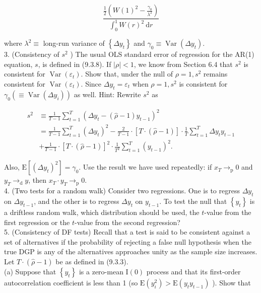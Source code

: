 \documentclass[10pt]{article}
\begin{document}
$$
\frac{\frac{1}{2}\left(W(1)^{2}-\frac{\gamma_{0}}{\lambda^{2}}\right)}{\int_{0}^{1} W(r)^{2} \mathrm{~d} r}
$$

where $\lambda^{2} \equiv$ long-run variance of $\left\{\Delta y_{t}\right\}$ and $\gamma_{0} \equiv \operatorname{Var}\left(\Delta y_{t}\right)$.\\
3. (Consistency of $s^{2}$ ) The usual OLS standard error of regression for the AR(1) equation, $s$, is defined in (9.3.8). If $|\rho|<1$, we know from Section 6.4 that $s^{2}$ is consistent for $\operatorname{Var}\left(\varepsilon_{t}\right)$. Show that, under the null of $\rho=1, s^{2}$ remains consistent for $\operatorname{Var}\left(\varepsilon_{t}\right)$. Since $\Delta y_{t}=\varepsilon_{t}$ when $\rho=1, s^{2}$ is consistent for $\gamma_{0} \left(\equiv \operatorname{Var}\left(\Delta y_{i}\right)\right)$ as well. Hint: Rewrite $s^{2}$ as

$$
\begin{aligned}
s^{2} & \equiv \frac{1}{T-1} \sum_{t=1}^{T}\left(\Delta y_{t}-(\hat{\rho}-1) y_{t-1}\right)^{2} \\
& =\frac{1}{T-1} \sum_{t=1}^{T}\left(\Delta y_{t}\right)^{2}-\frac{2}{T-1} \cdot[T \cdot(\hat{\rho}-1)] \cdot \frac{1}{T} \sum_{t=1}^{T} \Delta y_{t} y_{t-1} \\
& +\frac{1}{T-1} \cdot[T \cdot(\hat{\rho}-1)]^{2} \cdot \frac{1}{T^{2}} \sum_{t=1}^{T}\left(y_{t-1}\right)^{2} .
\end{aligned}
$$

Also, $\mathrm{E}\left[\left(\Delta y_{t}\right)^{2}\right]=\gamma_{0}$. Use the result we have used repeatedly: if $x_{T} \rightarrow_{\mathrm{p}} 0$ and $y_{T} \rightarrow_{\mathrm{d}} y$, then $x_{T} \cdot y_{T} \rightarrow_{\mathrm{p}} 0$.\\
4. (Two tests for a random walk) Consider two regressions. One is to regress $\Delta y_{t}$ on $\Delta y_{t-1}$, and the other is to regress $\Delta y_{t}$ on $y_{t-1}$. To test the null that $\left\{y_{t}\right\}$ is a driftless random walk, which distribution should be used, the $t$-value from the first regression or the $t$-value from the second regression?\\
5. (Consistency of DF tests) Recall that a test is said to be consistent against a set of alternatives if the probability of rejecting a false null hypothesis when the true DGP is any of the alternatives approaches unity as the sample size increases. Let $T \cdot(\hat{\rho}-1)$ be as defined in (9.3.3).\\
(a) Suppose that $\left\{y_{t}\right\}$ is a zero-mean $\mathrm{I}(0)$ process and that its first-order autocorrelation coefficient is less than 1 (so $\mathrm{E}\left(y_{i}^{2}\right)>\mathrm{E}\left(y_{t} y_{t-1}\right)$ ). Show that
\end{document}
